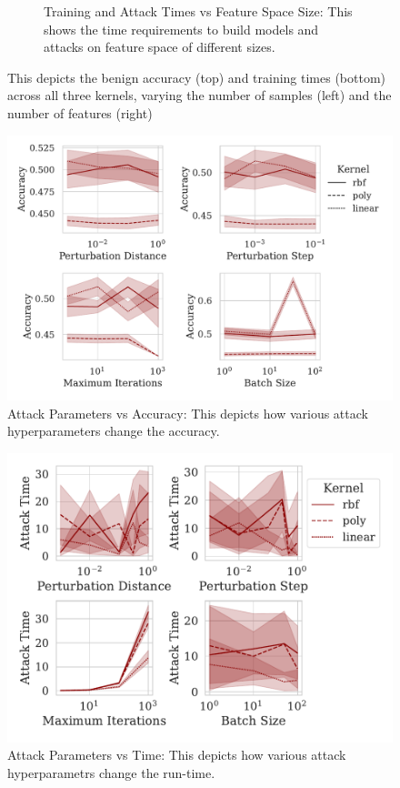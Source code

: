 \documentclass[runningheads]{llncs}
\begin{document}
\begin{figure}
\begin{subfigure}{.45\textwidth}
        \caption{Training and Attack Times vs Feature Space Size: This shows the time requirements to build models and attacks on feature space of different sizes. 
        }
        \label{fig:features_time}
    \end{subfigure}
    \label{fig:model}
    \caption{This depicts the benign accuracy (top) and training times (bottom) across all three kernels, varying the number of samples (left) and the number of features (right)}
\end{figure}

\begin{figure}[!htb]
  \centering
  \includegraphics[width=.75\textwidth]{./generated/accuracy_vs_attack_parameters.pdf}
   \caption{Attack Parameters vs Accuracy: This depicts how various attack hyperparameters change the accuracy.
   }
   \label{fig:attack_accuracy}
\end{figure}


\begin{figure}
    \centering
    \includegraphics[width=.75\textwidth]{./generated/train_time_vs_attack_parameters.pdf}
    \caption{Attack Parameters vs Time: This depicts how various attack hyperparametrs change the run-time.}
    \label{fig:attack_time}
\end{figure}
\end{document}

